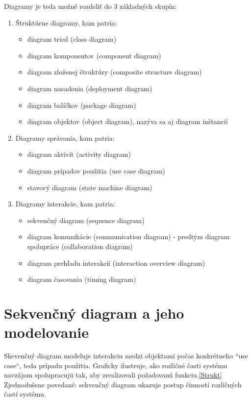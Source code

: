 \documentclass[10pt,twoside,slovak,a4paper]{article}
\begin{document}
 Diagramy je teda možné rozdeliť do 3 základných skupín\cite{WIKI}:

\begin{enumerate}
\item Štruktúrne diagramy, kam patria:
	\begin{itemize}
	\item diagram tried (class diagram)
	\item diagram komponentov (component diagram)
	\item diagram zloženej štruktúry (composite structure diagram)
	\item diagram nasadenia (deployment diagram)
	\item diagram balíčkov (package diagram)
	\item diagram objektov (object diagram), nazýva sa aj diagram inštancií
	\end{itemize}
\item Diagramy správania, kam patria:
	\begin{itemize}
	\item diagram aktivít (activity diagram)
	\item diagram prípadov použitia (use case diagram)
	\item stavový diagram (state machine diagram)
	\end{itemize}

\item Diagramy interakcie, kam patria:
	\begin{itemize}
	\item sekvenčný diagram (sequence diagram)
	\item diagram komunikácie (communication diagram) - predtým diagram spolupráce (collaboration diagram)
	\item diagram prehľadu interakcií (interaction overview diagram)
	\item diagram časovania (timing diagram)
	\end{itemize}
\end{enumerate}



\section{Sekvenčný diagram a jeho modelovanie} \label{3sek}

Skevenčný diagram modeluje interakciu medzi objektami počas konkrétneho ``use case“, teda prípadu použitia. Graficky ilustruje, ako rozličné časti systému navzájom spolupracujú tak, aby zrealizovali požadovanú funkciu.\ref{Strukt} Zjednodušene povedané: sekvenčný diagram ukazuje postup činností rozličných častí systému\cite{SDT}.\newline
\end{document}
